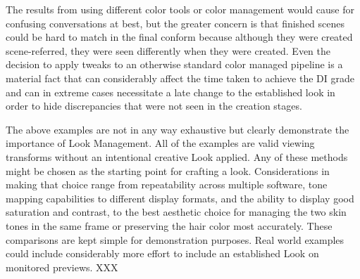 The results from using different color tools or color management would cause for confusing conversations at best, but the greater concern is that finished scenes could be hard to match in the final conform because although they were created scene-referred, they were seen differently when they were created. Even the decision to apply tweaks to an otherwise standard color managed pipeline is a material fact that can considerably affect the time taken to achieve the DI grade and can in extreme cases necessitate a late change to the established look in order to hide discrepancies that were not seen in the creation stages. 

The above examples are not in any way exhaustive but clearly demonstrate the importance of Look Management. All of the examples are valid viewing transforms without an intentional creative Look applied. Any of these methods might be chosen as the starting point for crafting a look. Considerations in making that choice range from repeatability across multiple software, tone mapping capabilities to different display formats, and the ability to display good saturation and contrast, to the best aesthetic choice for managing the two skin tones in the same frame or preserving the hair color most accurately. These comparisons are kept simple for demonstration purposes. Real world examples could include considerably more effort to include an established Look on monitored previews.
XXX

